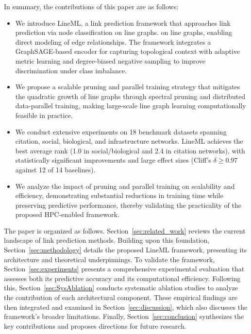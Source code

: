 \documentclass[pdflatex,sn-mathphys-num]{sn-jnl}%
\theoremstyle{thmstyleone}%
\theoremstyle{thmstyletwo}%
\theoremstyle{thmstylethree}%
\theoremstyle{plain} %
\theoremstyle{definition} %
\theoremstyle{remark} %
\theoremstyle{plain} %
\begin{document}
In summary, the contributions of this paper are as follows: 
\begin{itemize} 
\item We introduce LineML, a link prediction framework that approaches link prediction via node classification on line graphs. on line graphs, enabling direct modeling of edge relationships. The framework integrates a GraphSAGE-based encoder for capturing topological context with adaptive metric learning and degree-biased negative sampling to improve discrimination under class imbalance.

\item We propose a scalable pruning and parallel training strategy that mitigates the quadratic growth of line graphs through spectral pruning and distributed data-parallel training, making large-scale line graph learning computationally feasible in practice.

\item We conduct extensive experiments on 18 benchmark datasets spanning citation, social, biological, and infrastructure networks. LineML achieves the best average rank (1.0 in social/biological and 2.4 in citation networks), with statistically significant improvements and large effect sizes (Cliff’s $\delta \geq 0.97$ against 12 of 14 baselines).

\item We analyze the impact of pruning and parallel training on scalability and efficiency, demonstrating substantial reductions in training time while preserving predictive performance, thereby validating the practicality of the proposed HPC-enabled framework.
\end{itemize}



The paper is organized as follows. 
Section~\ref{sec:related_work} reviews the current landscape of link prediction methods. 
Building upon this foundation, Section~\ref{sec:methodology} details the proposed LineML framework, presenting its architecture and theoretical underpinnings. 
To validate the framework, Section~\ref{sec:experiments} presents a comprehensive experimental evaluation that assesses both its predictive accuracy and its computational efficiency. 
Following this, Section~\ref{sec:SysAblation} conducts systematic ablation studies to analyze the contribution of each architectural component. 
These empirical findings are then integrated and examined in Section~\ref{sec:discussion}, which also discusses the framework's broader limitations. 
Finally, Section~\ref{sec:conclusion} synthesizes the key contributions and proposes directions for future research.
\end{document}
